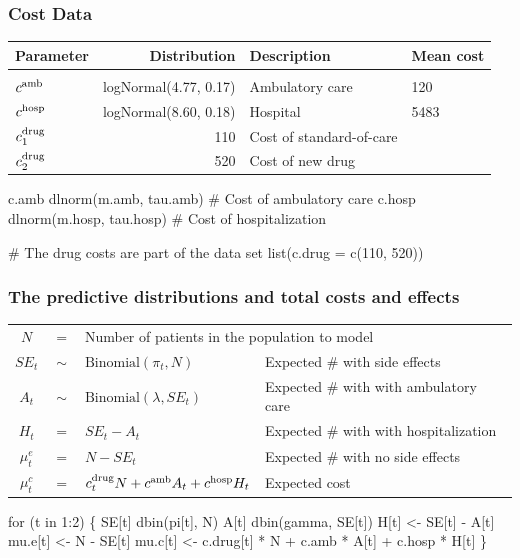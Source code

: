 \begin{frame}[fragile]

\frametitle{Cost Data}

{\footnotesize
\begin{center}
\begin{tabular}{lrll}
\hline
Parameter  & Distribution & Description & Mean cost\\
  \hline\\[-6pt]
  $c^{\rm{amb}}$ & logNormal(4.77, 0.17) & Ambulatory care & 120 \\
  $c^{\rm{hosp}}$ &  logNormal(8.60, 0.18) & Hospital & 5483 \\
  $c_1^{\rm{drug}}$ & 110  & Cost of standard-of-care \\
  $c_2^{\rm{drug}}$ & 520 & Cost of new drug \\
  \hline
\end{tabular}
\end{center}
}

\vfill 

{\small
\begin{semiverbatim}
\olive
c.amb \mytilde  dlnorm(m.amb, tau.amb)     # Cost of ambulatory care
c.hosp \mytilde  dlnorm(m.hosp, tau.hosp)  # Cost of hospitalization

# The drug costs are part of the data set
list(c.drug = c(110, 520))
\end{semiverbatim}
}

\end{frame}



\begin{frame}[fragile]
\frametitle{The predictive distributions and total costs and effects}

{\footnotesize
\begin{tabular}{ccll}
$N$     & $=$ & \multicolumn{2}{l}{Number of patients in the population to model} \\
$SE_t$  & $\sim$ & $\mbox{Binomial}(\pi_t, N)$            & Expected \#  with side effects \\
$A_t$   & $\sim$ & $\mbox{Binomial}(\lambda, SE_t)$          & Expected \#  with with ambulatory care\\
$H_t$   & $=$ & $SE_t - A_t$                           & Expected \# with with hospitalization \\
$\mu_t^e$  & $=$ & $ N - SE_t$                   & Expected \# with no side effects \\
$\mu_t^c$  & $=$ & $ c_t^{\rm{drug}} N + c^{\rm{amb}} A_t +c^{\rm{hosp}} H_t$ & Expected cost \\
\end{tabular}
}

{\small
\begin{semiverbatim}
\olive 
for (t in 1:2) \{
    SE[t] \mytilde dbin(pi[t], N)
    A[t] \mytilde dbin(gamma, SE[t])
    H[t] <- SE[t] - A[t]
    mu.e[t] <- N - SE[t]
    mu.c[t] <- c.drug[t] * N + c.amb * A[t] + c.hosp * H[t]
\}
\end{semiverbatim}
}

\end{frame}

